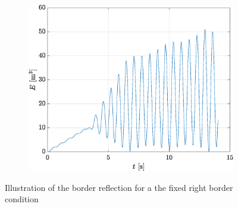 \documentclass[a4paper,12pt,twoside]{article}
\begin{document}
\begin{figure}[h]
 \centering
 \begin{subfigure}{0.5\textwidth}
  \includegraphics[width=\textwidth]{graphs/ex1Efixe.eps}
 \end{subfigure}

 \caption{Illustration of the border reflection for a the fixed right border condition}
 \label{fig:ex1fix}
\end{figure}
\end{document}
